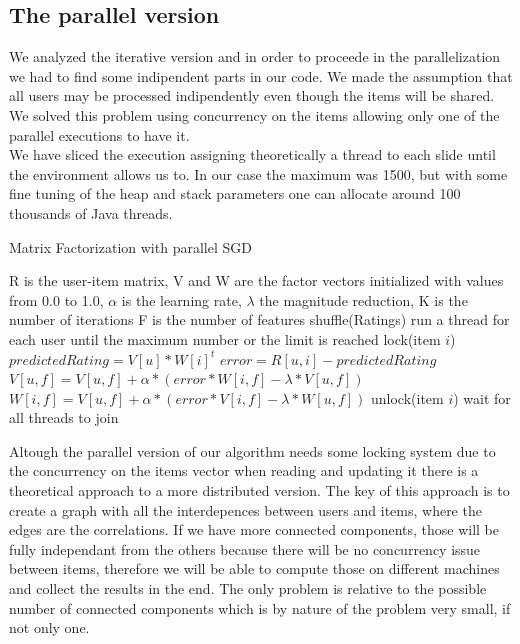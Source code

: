 \documentclass{sig-alternate-05-2015}
\begin{document}
\subsection{The parallel version}
We analyzed the iterative version and in order to proceede in the parallelization
we had to find some indipendent parts in our code. We made the assumption
that all users may be processed indipendently even though the items will be shared.
We solved this problem using concurrency on the items allowing only one of the
parallel executions to have it. \\
We have sliced the execution assigning theoretically a thread to each slide
until the environment allows us to. In our case the maximum was 1500, but with
some fine tuning of the heap and stack parameters one can allocate around 100 thousands
of Java threads.\cite{stack}\\

\begin{algorithm}
    \caption{Matrix Factorization with parallel SGD}

    \begin{algorithmic}[1]
        \Require
            \Statex R is the user-item matrix,
            \Statex V and W are the factor vectors initialized with values from 0.0 to 1.0,
            \Statex $\alpha$ is the learning rate,
            \Statex $\lambda$ the magnitude reduction,
            \Statex K is the number of iterations
            \Statex F is the number of features
    \State shuffle(Ratings)
        \State run a thread for each user until the maximum number or the limit is reached
                \State lock(item $i$)
                \State $predictedRating = V[u] * W[i]^{t}$
                \State $error = R[u,i] - predictedRating$
                        \State $V[u,f] = V[u,f] + \alpha * (error * W[i,f] - \lambda * V[u,f])$
                        \State $W[i,f] = V[u,f] + \alpha * (error * V[i,f] - \lambda * W[u,f])$
                    \EndFor
                \State unlock(item $i$)
            \EndFor
        \EndFor
    \State wait for all threads to join
    \EndFor
    \end{algorithmic}
\end{algorithm}

Altough the parallel version of our algorithm needs some locking system
due to the concurrency on the items vector when reading and updating it
there is a theoretical approach to a more distributed version. The key
of this approach is to create a graph with all the interdepences between
users and items, where the edges are the correlations. If we have
more connected components, those will be fully independant from the others
because there will be no concurrency issue between items, therefore we
will be able to compute those on different machines and collect the results in the end.
The only problem is relative to the possible number of connected components which
is by nature of the problem very small, if not only one.
\end{document}
